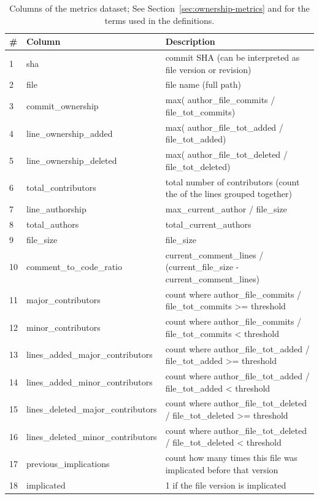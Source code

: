 \begin{table}[t]
\centering
\caption{Columns of the metrics dataset;  See
Section~\ref{sec:ownership-metrics} and  for the terms used in the definitions.}
\label{tab:metrics}
\footnotesize
\begin{tabular}{|l|l|p{}|}
\hline
\# & \textbf{Column} & \textbf{Description}  \\
\hline
1 & sha & 
    commit SHA (can be interpreted as file version or revision) \\ \hline
2 & file & 
    file name (full path)\\ \hline
3 & commit\_ownership & 
    max( author\_file\_commits / file\_tot\_commits)\\ \hline
4 & line\_ownership\_added & 
    max( author\_file\_tot\_added / file\_tot\_added)\\ \hline
5 & line\_ownership\_deleted & 
    max( author\_file\_tot\_deleted / file\_tot\_deleted)\\ \hline
6 & total\_contributors & 
    total number of contributors (count the of the lines grouped together) \\ \hline %
7 & line\_authorship & 
    max\_current\_author / file\_size \\ \hline
8 & total\_authors & 
    total\_current\_authors\\ \hline
9 & file\_size & 
    file\_size\\ \hline
10 & comment\_to\_code\_ratio & 
    current\_comment\_lines / (current\_file\_size - current\_comment\_lines)\\ \hline
11 & major\_contributors & 
    count where author\_file\_commits / file\_tot\_commits >= threshold\\ \hline
12 & minor\_contributors & 
    count where author\_file\_commits / file\_tot\_commits < threshold\\ \hline
13 & lines\_added\_major\_contributors & 
    count where author\_file\_tot\_added / file\_tot\_added >= threshold\\ \hline
14 & lines\_added\_minor\_contributors & 
    count where author\_file\_tot\_added / file\_tot\_added < threshold\\ \hline
15 & lines\_deleted\_major\_contributors & 
    count where author\_file\_tot\_deleted / file\_tot\_deleted >= threshold\\ \hline
16 & lines\_deleted\_minor\_contributors & 
    count where author\_file\_tot\_deleted / file\_tot\_deleted < threshold\\ \hline
17 & previous\_implications &
    count how many times this file was implicated before that version\\\hline
18 & implicated & 1 if the file version is implicated \\\hline
\end{tabular}
\end{table}


